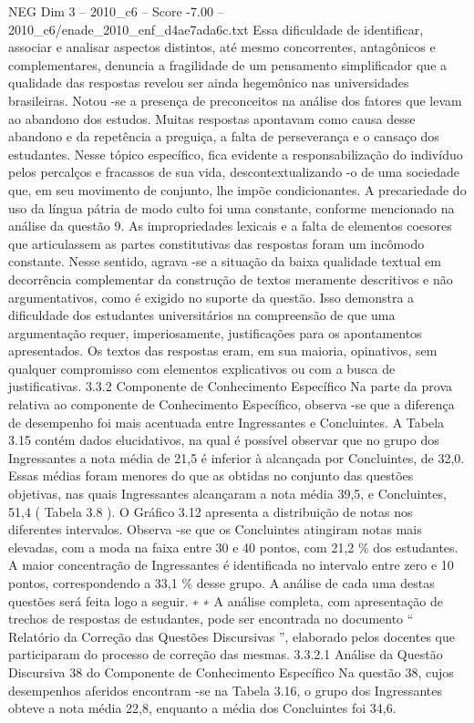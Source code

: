\begin{textsample}{NEG Dim 3 – 2010\_c6 – Score -7.00 – 2010\_c6/enade\_2010\_enf\_d4ae7ada6c.txt}
Essa dificuldade de identificar, associar e analisar aspectos distintos, até mesmo concorrentes, antagônicos e complementares, denuncia a fragilidade de um pensamento simplificador que a qualidade das respostas revelou ser ainda hegemônico nas universidades brasileiras.
Notou -se a presença de preconceitos na análise dos fatores que levam ao abandono dos estudos.
Muitas respostas apontavam como causa desse abandono e da repetência a preguiça, a falta de perseverança e o cansaço dos estudantes.
Nesse tópico específico, fica evidente a responsabilização do indivíduo pelos percalços e fracassos de sua vida, descontextualizando -o de uma sociedade que, em seu movimento de conjunto, lhe impõe condicionantes.
A precariedade do uso da língua pátria de modo culto foi uma constante, conforme mencionado na análise da questão 9.
As impropriedades lexicais e a falta de elementos coesores que articulassem as partes constitutivas das respostas foram um incômodo constante.
Nesse sentido, agrava -se a situação da baixa qualidade textual em decorrência complementar da construção de textos meramente descritivos e não argumentativos, como é exigido no suporte da questão.
Isso demonstra a dificuldade dos estudantes universitários na compreensão de que uma argumentação requer, imperiosamente, justificações para os apontamentos apresentados.
Os textos das respostas eram, em sua maioria, opinativos, sem qualquer compromisso com elementos explicativos ou com a busca de justificativas. 3.3.2 Componente de Conhecimento Específico Na parte da prova relativa ao componente de Conhecimento Específico, observa -se que a diferença de desempenho foi mais acentuada entre Ingressantes e Concluintes.
A Tabela 3.15 contém dados elucidativos, na qual é possível observar que no grupo dos Ingressantes a nota média de 21,5 é inferior à alcançada por Concluintes, de 32,0.
Essas médias foram menores do que as obtidas no conjunto das questões objetivas, nas quais Ingressantes alcançaram a nota média 39,5, e Concluintes, 51,4 ( Tabela 3.8 ).
O Gráfico 3.12 apresenta a distribuição de notas nos diferentes intervalos.
Observa -se que os Concluintes atingiram notas mais elevadas, com a moda na faixa entre 30 e 40 pontos, com 21,2 \% dos estudantes.
A maior concentração de Ingressantes é identificada no intervalo entre zero e 10 pontos, correspondendo a 33,1 \% desse grupo.
A análise de cada uma destas questões será feita logo a seguir. ∗ ∗ A análise completa, com apresentação de trechos de respostas de estudantes, pode ser encontrada no documento “ Relatório da Correção das Questões Discursivas ”, elaborado pelos docentes que participaram do processo de correção das mesmas. 3.3.2.1 Análise da Questão Discursiva 38 do Componente de Conhecimento Específico Na questão 38, cujos desempenhos aferidos encontram -se na Tabela 3.16, o grupo dos Ingressantes obteve a nota média 22,8, enquanto a média dos Concluintes foi 34,6.

\end{textsample}
